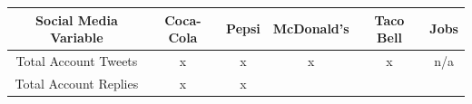 \documentclass[12pt,oneside]{chicagocapstone}
\begin{document}
\begin{longtable}[]{@{}cccccc@{}}
\toprule
\begin{minipage}[b]{0.21\columnwidth}\centering
Social Media Variable\strut
\end{minipage} & \begin{minipage}[b]{0.11\columnwidth}\centering
Coca-Cola\strut
\end{minipage} & \begin{minipage}[b]{0.12\columnwidth}\centering
Pepsi\strut
\end{minipage} & \begin{minipage}[b]{0.14\columnwidth}\centering
McDonald's\strut
\end{minipage} & \begin{minipage}[b]{0.14\columnwidth}\centering
Taco Bell\strut
\end{minipage} & \begin{minipage}[b]{0.12\columnwidth}\centering
Jobs\strut
\end{minipage}\tabularnewline
\midrule
\endhead
\begin{minipage}[t]{0.21\columnwidth}\centering
Total Account Tweets\strut
\end{minipage} & \begin{minipage}[t]{0.11\columnwidth}\centering
x\strut
\end{minipage} & \begin{minipage}[t]{0.12\columnwidth}\centering
x\strut
\end{minipage} & \begin{minipage}[t]{0.14\columnwidth}\centering
x\strut
\end{minipage} & \begin{minipage}[t]{0.14\columnwidth}\centering
x\strut
\end{minipage} & \begin{minipage}[t]{0.12\columnwidth}\centering
n/a\strut
\end{minipage}\tabularnewline
\begin{minipage}[t]{0.21\columnwidth}\centering
Total Account Replies\strut
\end{minipage} & \begin{minipage}[t]{0.11\columnwidth}\centering
x\strut
\end{minipage} & \begin{minipage}[t]{0.12\columnwidth}\centering
x\strut
\end{minipage} & \begin{minipage}[t]{0.14\columnwidth}\centering

\end{minipage}
\end{longtable}
\end{document}
